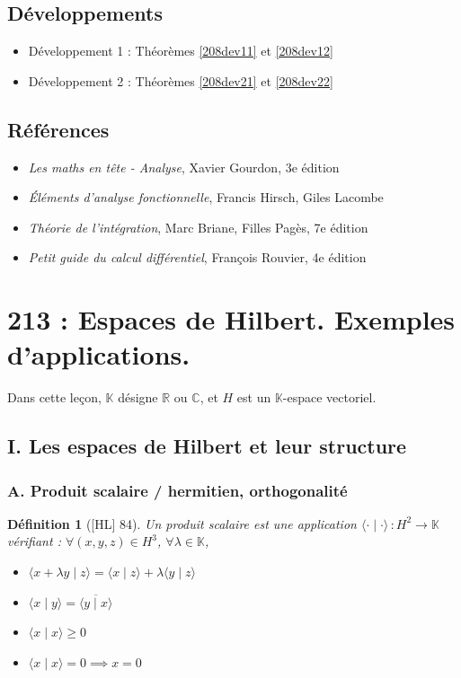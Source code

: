 \documentclass[10pt, a4paper, parskip=full, twoside, twocolumn]{report}
\newtheorem{definition}{Définition}
\newcommand{\IK}{\mathbb{K}}
\newcommand{\IC}{\mathbb{C}}
\newcommand{\IR}{\mathbb{R}}
\newcommand{\ps}[2]{\langle #1\mid #2\rangle}
\begin{document}
\section*{Développements}
\begin{itemize}
	\item Développement 1 : Théorèmes \ref{208dev11} et \ref{208dev12}
	\item Développement 2 : Théorèmes \ref{208dev21} et \ref{208dev22}
\end{itemize}

\section*{Références}
\begin{itemize}
	\item[G] \emph{Les maths en tête - Analyse}, Xavier Gourdon, 3e édition 
	\item[HL] \emph{Éléments d'analyse fonctionnelle}, Francis Hirsch, Giles Lacombe
	\item[BP] \emph{Théorie de l'intégration}, Marc Briane, Filles Pagès, 7e édition
	\item[Rv] \emph{Petit guide du calcul différentiel}, François Rouvier, 4e édition
\end{itemize}

\chapter*{213 : Espaces de Hilbert. Exemples d’applications.}
\setcounter{definition}{0}

\textcolor{paragraphtext}{Dans cette leçon, $\IK$ désigne $\IR$ ou $\IC$, et $H$ est un $\IK$-espace vectoriel.}

\section*{I. Les espaces de Hilbert et leur structure}
\subsection*{A. Produit scalaire / hermitien, orthogonalité}

\begin{definition}[\textnormal{[HL] 84}]
	Un \emph{produit scalaire} est une application $\ps{\cdot}{\cdot}\,\colon H^2\to\IK$ vérifiant :
	$\forall (x,y,z)\in H^3$, $\forall\lambda\in\IK$,
	\begin{itemize}
		\item $\ps{x+\lambda y}{z} = \ps{x}{z}+\lambda\ps{y}{z}$
		\item $\ps{x}{y} = \overline{\ps{y}{x}}$
		\item $\ps{x}{x} \geq 0$
		\item $\ps{x}{x} = 0 \implies x=0$
	\end{itemize}
\end{definition}
\end{document}
